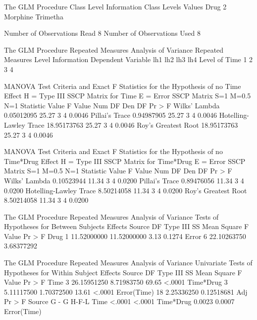 \documentclass{article}
\begin{document}
\begin{Woutput}
The GLM Procedure
         Class Level Information
Class         Levels    Values
Drug               2    Morphine Trimetha

Number of Observations Read           8
Number of Observations Used           8

The GLM Procedure
Repeated Measures Analysis of Variance
           Repeated Measures Level Information
Dependent Variable         lh1      lh2      lh3      lh4
     Level of Time           1        2        3        4

                MANOVA Test Criteria and Exact F Statistics
                   for the Hypothesis of no Time Effect
                     H = Type III SSCP Matrix for Time
                           E = Error SSCP Matrix
                            S=1    M=0.5    N=1
Statistic                       Value   F Value   Num DF   Den DF   Pr > F
Wilks' Lambda              0.05012095     25.27        3        4   0.0046
Pillai's Trace             0.94987905     25.27        3        4   0.0046
Hotelling-Lawley Trace    18.95173763     25.27        3        4   0.0046
Roy's Greatest Root       18.95173763     25.27        3        4   0.0046

                MANOVA Test Criteria and Exact F Statistics
                 for the Hypothesis of no Time*Drug Effect
                  H = Type III SSCP Matrix for Time*Drug
                           E = Error SSCP Matrix
                            S=1    M=0.5    N=1
Statistic                       Value   F Value   Num DF   Den DF   Pr > F
Wilks' Lambda              0.10523944     11.34        3        4   0.0200
Pillai's Trace             0.89476056     11.34        3        4   0.0200
Hotelling-Lawley Trace     8.50214058     11.34        3        4   0.0200
Roy's Greatest Root        8.50214058     11.34        3        4   0.0200

The GLM Procedure
Repeated Measures Analysis of Variance
Tests of Hypotheses for Between Subjects Effects
Source                    DF   Type III SS   Mean Square  F Value  Pr > F
Drug                       1   11.52000000   11.52000000     3.13  0.1274
Error                      6   22.10263750    3.68377292

The GLM Procedure
Repeated Measures Analysis of Variance
Univariate Tests of Hypotheses for Within Subject Effects
Source                    DF   Type III SS   Mean Square  F Value  Pr > F
Time                       3   26.15951250    8.71983750    69.65  <.0001
Time*Drug                  3    5.11117500    1.70372500    13.61  <.0001
Error(Time)               18    2.25336250    0.12518681
                         Adj Pr > F
Source                 G - G     H-F-L
Time                  <.0001    <.0001
Time*Drug             0.0023    0.0007
Error(Time)


\end{Woutput}
\end{document}

